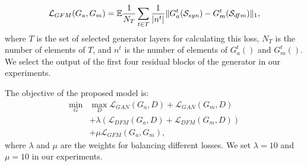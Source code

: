 \begin{equation}
\label{eqn:loss_GFM}
\mathcal{L}_{GFM}(G_a, G_m)=\mathbb{E}\frac{1}{N_T} \sum_{t\in T}  \frac{1}{|n^t|} \|G_a^t(\mathcal{S}_{syn})-G_m^t(\mathcal{S}_{dfm}) \|_1,
\end{equation}
where $T$ is the set of selected generator layers for calculating this loss, $N_T$ is the number of elements of $T$, and $n^t$ is the number of elements of $G_a^t()$ and $G_m^t()$.
We select the output of the first four residual blocks of the generator in our experiments.

%
The objective of the proposed model is:
%
\begin{equation}
	\label{eqn:new_minmax_game}
	\begin{aligned}
		\min_G  &\max_{D} \mathcal{L}_{GAN}(G_a, D)+ \mathcal{L}_{GAN}(G_m, D) \\
		& +\lambda (\mathcal{L}_{DFM}(G_a, D) +\mathcal{L}_{DFM}(G_m, D)) \\
		& +\mu \mathcal{L}_{GFM}(G_a, G_m),
	\end{aligned}
\end{equation}
%
where $\lambda$ and $\mu$ are the weights for balancing different losses. We set $\lambda=10$ and $\mu=10$ in our experiments.